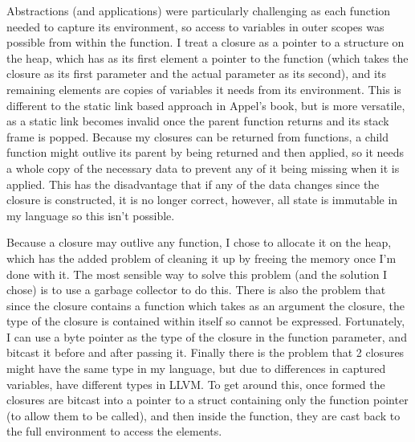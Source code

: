 Abstractions (and applications) were particularly challenging as each function needed to capture its
environment, so access to variables in outer scopes was possible from within the function.
I treat a closure as a pointer to a structure on the heap, which has as its first element a pointer
to the function (which takes the closure as its first parameter and the actual parameter as its second),
and its remaining elements are copies of variables it needs from its environment.
This is different to the static link based approach in Appel's book, but is more versatile, as a
static link becomes invalid once the parent function returns and its stack frame is popped.
Because my closures can be returned from functions, a child function might outlive its parent by being
returned and then applied, so it needs a whole copy of the necessary data to prevent any of it being
missing when it is applied.
This has the disadvantage that if any of the data changes since the closure is constructed, it is no longer
correct, however, all state is immutable in my language so this isn't possible.

Because a closure may outlive any function, I chose to allocate it on the heap, which has the added problem
of cleaning it up by freeing the memory once I'm done with it.
The most sensible way to solve this problem (and the solution I chose) is to use a garbage collector to do this.
There is also the problem that since the closure contains a function which takes as an argument the closure,
the type of the closure is contained within itself so cannot be expressed.
Fortunately, I can use a byte pointer as the type of the closure in the function parameter, and bitcast it
before and after passing it.
Finally there is the problem that 2 closures might have the same type in my language, but due to differences
in captured variables, have different types in LLVM.
To get around this, once formed the closures are bitcast into a pointer to a struct containing only the
function pointer (to allow them to be called), and then inside the function, they are cast back to
the full environment to access the elements.


